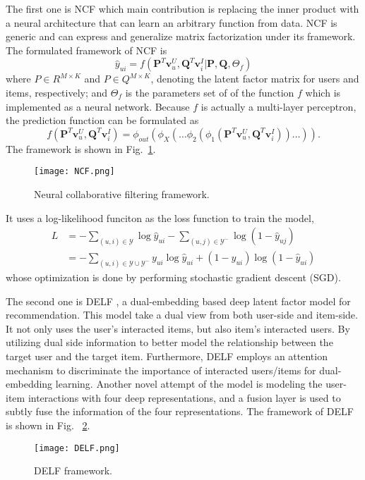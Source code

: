 The first one is NCF \cite{he2017neural} which main contribution is replacing
the inner product with a neural architecture that can learn an arbitrary 
function from data. NCF is generic and can express and generalize matrix 
factorization under its framework.
The formulated framework of NCF is 
\begin{equation}
    \hat{y}_{u i}=f\left(\mathbf{P}^{T} \mathbf{v}_{u}^{U}, \mathbf{Q}^{T} \mathbf{v}_{i}^{I} | \mathbf{P}, \mathbf{Q}, \Theta_{f}\right)
\end{equation}
where $P \in R^{M \times K}$ and $P \in Q^{M \times K}$, denoting the 
latent factor matrix for users and items, respectively; and $\Theta_{f}$
is the parameters set of of the function $f$ which is implemented as a
neural network. Because $f$ is actually a multi-layer perceptron, the 
prediction function can be formulated as
\begin{equation}
    f\left(\mathbf{P}^{T} \mathbf{v}_{u}^{U}, \mathbf{Q}^{T} \mathbf{v}_{i}^{I}\right)=\phi_{o u t}\left(\phi_{X}\left(\ldots \phi_{2}\left(\phi_{1}\left(\mathbf{P}^{T} \mathbf{v}_{u}^{U}, \mathbf{Q}^{T} \mathbf{v}_{i}^{I}\right)\right) \ldots\right)\right).
\end{equation}
The framework is shown in Fig.~\ref{fig:ncf}.
\begin{figure}[h]
	\centering
	\texttt{[image: NCF.png]}
	\caption{Neural collaborative filtering framework.}
	\label{fig:ncf}
	\vspace{-10pt}
\end{figure}
It uses a log-likelihood funciton as the loss function to train the model,
\begin{equation}
    \begin{aligned} L &=-\sum_{(u, i) \in \mathcal{Y}} \log \hat{y}_{u i}-\sum_{(u, j) \in \mathcal{Y}^{-}} \log \left(1-\hat{y}_{u j}\right) \\ &=-\sum_{(u, i) \in \mathcal{Y} \cup \mathcal{Y}^{-}} y_{u i} \log \hat{y}_{u i}+\left(1-y_{u i}\right) \log \left(1-\hat{y}_{u i}\right) \end{aligned}
\end{equation}
whose optimization is done by performing stochastic gradient descent (SGD).

The second one is DELF \cite{cheng2018delf}, a dual-embedding based deep latent factor 
model for recommendation. This model take a dual view from both user-side and
item-side. It not only uses the user's interacted items, but also item's interacted
users. By utilizing dual side information to better model the relationship
between the target user and the target item. Furthermore, DELF employs an 
attention mechanism to discriminate the importance of interacted 
users/items for dual-embedding learning. Another novel attempt of the model 
is modeling the user-item interactions with four deep representations, and a fusion
layer is used to subtly fuse the information of the four representations.
The framework of DELF is shown in Fig. ~\ref{fig:delf}.
\begin{figure}[h]
	\centering
	\texttt{[image: DELF.png]}
	\caption{DELF framework.}
	\label{fig:delf}
	\vspace{-10pt}
\end{figure}


